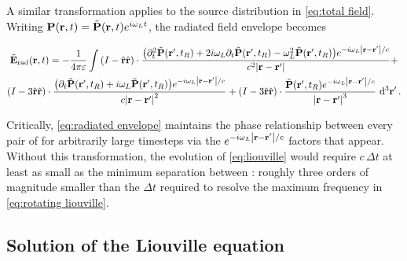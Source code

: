 A similar transformation applies to the source distribution in \cref{eq:total field}.
Writing $\vb{P}(\vb{r}, t) = \tilde{\vb{P}}(\vb{r}, t)e^{i \omega_L t}$, the radiated field envelope becomes
\begin{widetext}
\begin{equation}
  \begin{gathered}
    \tilde{\vb{E}}_\text{rad}(\vb{r}, t) = -\frac{1}{4\pi \varepsilon} \int 
    \qty(I -  \hat{\vb{r}}\hat{\vb{r}}) \cdot \frac{\qty(\partial_t^2 \tilde{\vb{P}}(\vb{r}', t_R) + 2 i \omega_L \partial_t \tilde{\vb{P}}(\vb{r}', t_R) - \omega_L^2 \tilde{\vb{P}}(\vb{r}', t_R)) e^{-i \omega_L \abs{\vb{r} - \vb{r}'}/c}}{c^2 \abs{\vb{r}-\vb{r}'}} + \\
    \qty(I - 3\hat{\vb{r}}\hat{\vb{r}}) \cdot \frac{\qty(\partial_t \tilde{\vb{P}}(\vb{r}', t_R) + i \omega_L \tilde{\vb{P}}(\vb{r}', t_R))e^{-i \omega_L \abs{\vb{r} - \vb{r}'}/c}}{c \abs{\vb{r}-\vb{r}'}^2} +
    \qty(I - 3\hat{\vb{r}}\hat{\vb{r}}) \cdot \frac{                \tilde{\vb{P}}(\vb{r}', t_R) e^{-i \omega_L \abs{\vb{r} - \vb{r}'}/c}}{\abs{\vb{r}-\vb{r}'}^3}
    \, \dd[3]{\vb{r'}}.
  \end{gathered}
  \label{eq:radiated envelope}
\end{equation}
\end{widetext}
Critically, \cref{eq:radiated envelope} maintains the phase relationship between every pair of \qds{} for arbitrarily large timesteps via the $e^{-i \omega_L \abs{\vb{r} - \vb{r}'}/c}$ factors that appear.
Without this transformation, the evolution of \cref{eq:liouville} would require $c \, \Delta t$ at least as small as the minimum separation between \qds{}: roughly three orders of magnitude smaller than the $\Delta t$ required to resolve the maximum frequency in \cref{eq:rotating liouville}.

\subsection{Solution of the Liouville equation}


